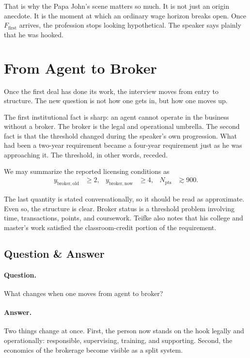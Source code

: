 That is why the Papa John's scene matters so much. It is not just an origin anecdote. It is the moment at which an ordinary wage horizon breaks open. Once \(F_{\mathrm{first}}\) arrives, the profession stops looking hypothetical. The speaker says plainly that he was hooked.

\section{From Agent to Broker}

Once the first deal has done its work, the interview moves from entry to structure. The new question is not how one gets in, but how one moves up.

The first institutional fact is sharp: an agent cannot operate in the business without a broker. The broker is the legal and operational umbrella. The second fact is that the threshold changed during the speaker's own progression. What had been a two-year requirement became a four-year requirement just as he was approaching it. The threshold, in other words, receded.

We may summarize the reported licensing conditions as
\begin{align}
y_{\mathrm{broker,old}} &\ge 2,
&
y_{\mathrm{broker,now}} &\ge 4,
&
N_{\mathrm{pts}} &\gtrsim 900.
\end{align}

The last quantity is stated conversationally, so it should be read as approximate. Even so, the structure is clear. Broker status is a threshold problem involving time, transactions, points, and coursework. Teifke also notes that his college and master's work satisfied the classroom-credit portion of the requirement.

\subsection{Question \& Answer}

\paragraph{Question.} What changes when one moves from agent to broker?

\paragraph{Answer.} Two things change at once. First, the person now stands on the hook legally and operationally: responsible, supervising, training, and supporting. Second, the economics of the brokerage become visible as a split system.

